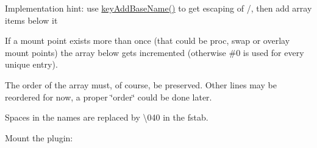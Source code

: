 Implementation hint\+: use {\ttfamily \mbox{\hyperlink{group__keyname_gaa942091fc4bd5c2699e49ddc50829524}{key\+Add\+Base\+Name()}}} to get escaping of {\ttfamily /}, then add array items below it

If a mount point exists more than once (that could be proc, swap or overlay mount points) the array below gets incremented (otherwise \#0 is used for every unique entry).

The order of the array must, of course, be preserved. Other lines may be reordered for now, a proper \char`\"{}order\char`\"{} could be done later.

Spaces in the names are replaced by \textbackslash{}040 in the fstab.

Mount the plugin\+:


\begin{DoxyCode}{0}
\end{DoxyCode}
 